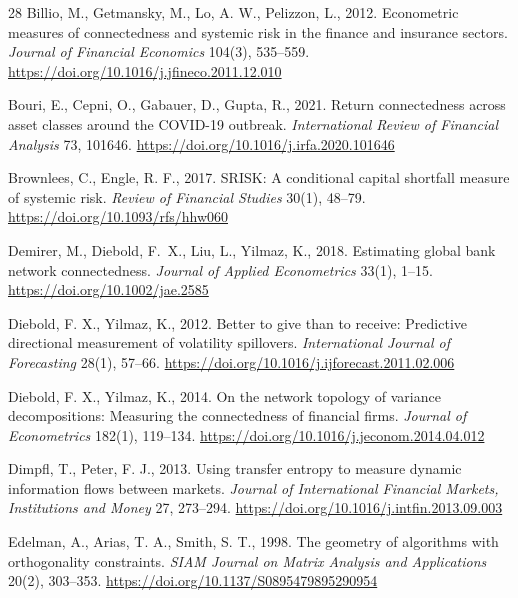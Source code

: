 \documentclass[review,12pt,authoryear]{elsarticle}
\begin{document}
\begin{thebibliography}{28}
Billio, M., Getmansky, M., Lo, A. W., Pelizzon, L., 2012.
\newblock Econometric measures of connectedness and systemic risk in the finance and insurance sectors.
\newblock \emph{Journal of Financial Economics} 104(3), 535--559. \url{https://doi.org/10.1016/j.jfineco.2011.12.010}

Bouri, E., Cepni, O., Gabauer, D., Gupta, R., 2021.
\newblock Return connectedness across asset classes around the COVID-19 outbreak.
\newblock \emph{International Review of Financial Analysis} 73, 101646. \url{https://doi.org/10.1016/j.irfa.2020.101646}

Brownlees, C., Engle, R. F., 2017.
\newblock SRISK: A conditional capital shortfall measure of systemic risk.
\newblock \emph{Review of Financial Studies} 30(1), 48--79. \url{https://doi.org/10.1093/rfs/hhw060}

Demirer, M., Diebold, F.~X., Liu, L., Yilmaz, K., 2018.
\newblock Estimating global bank network connectedness.
\newblock \emph{Journal of Applied Econometrics} 33(1), 1--15. \url{https://doi.org/10.1002/jae.2585}

Diebold, F. X., Yilmaz, K., 2012.
\newblock Better to give than to receive: Predictive directional measurement of volatility spillovers.
\newblock \emph{International Journal of Forecasting} 28(1), 57--66. \url{https://doi.org/10.1016/j.ijforecast.2011.02.006}

Diebold, F. X., Yilmaz, K., 2014.
\newblock On the network topology of variance decompositions: Measuring the connectedness of financial firms.
\newblock \emph{Journal of Econometrics} 182(1), 119--134. \url{https://doi.org/10.1016/j.jeconom.2014.04.012}

Dimpfl, T., Peter, F. J., 2013.
\newblock Using transfer entropy to measure dynamic information flows between markets.
\newblock \emph{Journal of International Financial Markets, Institutions and Money} 27, 273--294. \url{https://doi.org/10.1016/j.intfin.2013.09.003}

Edelman, A., Arias, T. A., Smith, S. T., 1998.
\newblock The geometry of algorithms with orthogonality constraints.
\newblock \emph{SIAM Journal on Matrix Analysis and Applications} 20(2), 303--353. \url{https://doi.org/10.1137/S0895479895290954}


\end{thebibliography}
\end{document}
